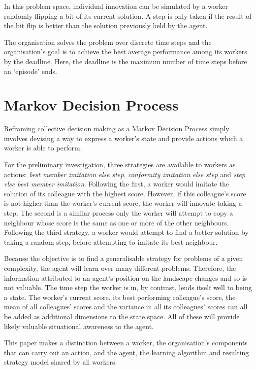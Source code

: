 \documentclass[conference]{IEEEtran}
\begin{document}
In this problem space,
individual innovation can be simulated
by a worker randomly flipping a bit of its current solution.
A step is only taken if the result of the bit flip is better
than the solution previously held by the agent.

The organisation solves the problem over discrete time steps
and the organisation's goal is to achieve
the best average performance among its workers
by the deadline.
Here, the deadline is the maximum number of time steps before an `episode' ends.


\section{Markov Decision Process}\label{mdp}

Reframing collective decision making as a Markov Decision Process
simply involves devising a way to express a worker's state
and provide actions which a worker is able to perform.

For the preliminary investigation,
three strategies are available to workers as actions:
\emph{best member imitation else step},
\emph{conformity imitation else step} and
\emph{step else best member imitation}.
Following the first, a worker would imitate the solution
of its colleague with the highest score.
However, if this colleague's score is not higher
than the worker's current score,
the worker will innovate taking a step.
The second is a similar process only the worker will attempt
to copy a neighbour
whose score is the same as one or more of the other neighbours.
Following the third strategy,
a worker would attempt to find a better solution by taking a random step,
before attempting to imitate its best neighbour.

Because the objective is to find a generalisable strategy
for problems of a given complexity,
the agent will learn over many different problems.
Therefore, the information attributed to an agent's position
on the landscape changes and so is not valuable.
The time step the worker is in, by contrast, lends itself well to being a state.
The worker's current score, its best performing colleague's score,
the mean of all colleagues' scores
and the variance in all its colleagues' scores
can all be added as additional dimensions to the state space.
All of these will provide likely valuable situational awareness to the agent.

This paper makes a distinction between a worker,
the organisation's components that can carry out an action,
and the agent,
the learning algorithm and resulting strategy model shared by all workers.
\end{document}
